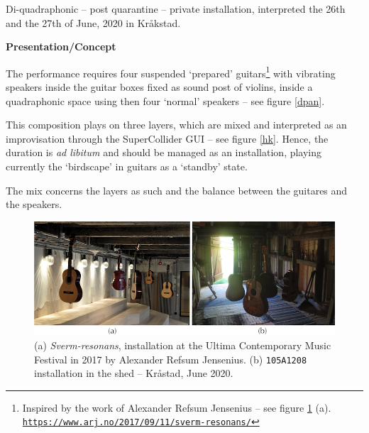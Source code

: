 Di-quadraphonic -- post quarantine -- private installation, interpreted the 26th and the 27th of June, 2020 in Kr\aa kstad.

\bigskip

\noindent \textbf{{\large Presentation/Concept}}
\hrulefill

\bigskip

The performance requires four suspended `prepared' guitars\footnote{Inspired by the work of Alexander Refsum Jensenius -- see figure \ref{arj} (a). \\ \href{https://www.arj.no/2017/09/11/sverm-resonans/}{\scriptsize{\texttt{https://www.arj.no/2017/09/11/sverm-resonans/}}}
} with vibrating speakers inside the guitar boxes fixed as sound post of violins, inside a quadraphonic space using then four `normal' speakers -- see figure \ref{dpan}.

This composition plays on three layers, which are mixed and interpreted as an improvisation through the SuperCollider GUI -- see figure \ref{hk}. Hence, the duration is \textit{ad libitum} and should be managed as an installation, playing currently the `birdscape' in guitars as a `standby' state. 

The mix concerns the layers as such and the balance between the guitares and the speakers.

 \begin{figure}[hbt]
\begin{center}
	\includegraphics[width=\textwidth]{img/6757}		
\caption{(a) \textit{Sverm-resonans}, installation at the Ultima Contemporary Music Festival in 2017 by Alexander Refsum Jensenius. (b) \texttt{105A1208} installation in the shed -- Kr\aa stad, June 2020.}
\label{arj}
\end{center}
\end{figure}

